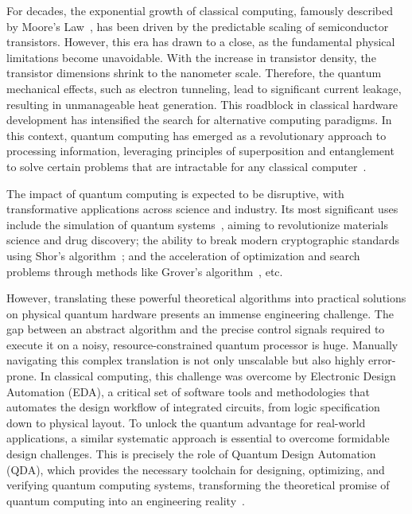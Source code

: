 \documentclass[a4paper,onecolumn,11pt,unpublished]{quantumarticle}
\begin{document}
For decades, the exponential growth of classical computing, famously described by Moore's Law~\cite{moore1965moore}, has been driven by the predictable scaling of semiconductor transistors. However, this era has drawn to a close, as the fundamental physical limitations become unavoidable. With the increase in transistor density, the transistor dimensions shrink to the nanometer scale. Therefore, the quantum mechanical effects, such as electron tunneling, lead to significant current leakage, resulting in unmanageable heat generation. This roadblock in classical hardware development has intensified the search for alternative computing paradigms. In this context, quantum computing has emerged as a revolutionary approach to processing information, leveraging principles of superposition and entanglement to solve certain problems that are intractable for any classical computer~\cite{Nielsen2010Quantum}.

The impact of quantum computing is expected to be disruptive, with transformative applications across science and industry. Its most significant uses include the simulation of quantum systems~\cite{Feynman1982}, aiming to revolutionize materials science and drug discovery; the ability to break modern cryptographic standards using Shor's algorithm~\cite{Shor1994}; and the acceleration of optimization and search problems through methods like Grover's algorithm~\cite{Grover1996}, etc.

However, translating these powerful theoretical algorithms into practical solutions on physical quantum hardware presents an immense engineering challenge. The gap between an abstract algorithm and the precise control signals required to execute it on a noisy, resource-constrained quantum processor is huge. Manually navigating this complex translation is not only unscalable but also highly error-prone. In classical computing, this challenge was overcome by Electronic Design Automation (EDA), a critical set of software tools and methodologies that automates the design workflow of integrated circuits, from logic specification down to physical layout. To unlock the quantum advantage for real-world applications, a similar systematic approach is essential to overcome formidable design challenges. This is precisely the role of Quantum Design Automation (QDA), which provides the necessary toolchain for designing, optimizing, and verifying quantum computing systems, transforming the theoretical promise of quantum computing into an engineering reality~\cite{Micheli2022, Almudever2024}.
\end{document}
